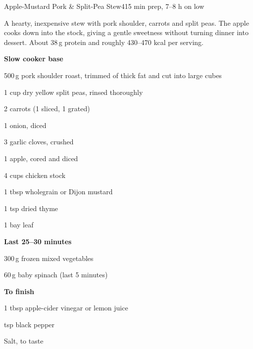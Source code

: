 

\begin{recipebox}{Apple-Mustard Pork \& Split-Pea Stew}{4}{15 min prep, 7--8 h on low}

A hearty, inexpensive stew with pork shoulder, carrots and split peas. The apple
cooks down into the stock, giving a gentle sweetness without turning dinner into
dessert. About 38\,g protein and roughly 430--470 kcal per serving.

\begin{ingredients}
  \item[] \textbf{Slow cooker base}
  \item 500\,g pork shoulder roast, trimmed of thick fat and cut into large cubes
  \item 1 cup dry yellow split peas, rinsed thoroughly
  \item 2 carrots (1 sliced, 1 grated)
  \item 1 onion, diced
  \item 3 garlic cloves, crushed
  \item 1 apple, cored and diced
  \item 4 cups chicken stock
  \item 1 tbsp wholegrain or Dijon mustard
  \item 1 tsp dried thyme
  \item 1 bay leaf
  \item[] \textbf{Last 25--30 minutes}
  \item 300\,g frozen mixed vegetables
  \item 60\,g baby spinach (last 5 minutes)
  \item[] \textbf{To finish}
  \item 1 tbsp apple-cider vinegar or lemon juice
  \item {} tsp black pepper
  \item Salt, to taste
\end{ingredients}


\end{recipebox}
